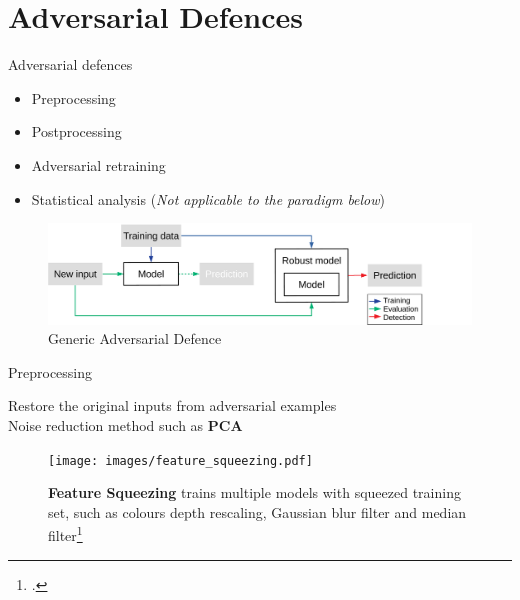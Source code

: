 \documentclass[9pt]{beamer}
\begin{document}
\section{Adversarial Defences}

\begin{frame}{Adversarial defences}
\label{defence}

\begin{itemize}
    \item Preprocessing
    \item Postprocessing
    \item Adversarial retraining
    \item Statistical analysis (\textit{Not applicable to the paradigm below})
\end{itemize}

\begin{figure}
    \centering
    \small
    \includegraphics[width=\linewidth]{images/generic-defence.pdf}
    \caption{Generic Adversarial Defence}
    \label{fig:defence}
\end{figure}

\hyperlink{blackbox_defence}{}
\end{frame}

\begin{frame}{Preprocessing}
\label{preprocessing}

Restore the original inputs from adversarial examples\\
Noise reduction method such as \textbf{PCA}
\begin{examples}
    \begin{figure}
        \centering
        \small
        \texttt{[image: images/feature\_squeezing.pdf]}
        \caption{\textbf{Feature Squeezing} trains multiple models with squeezed training set, such as colours depth rescaling, Gaussian blur filter and median filter\footcite{xu2017feature}}
    \end{figure}
\end{examples}

\hyperlink{adv_examples}{}
\end{frame}
\end{document}

